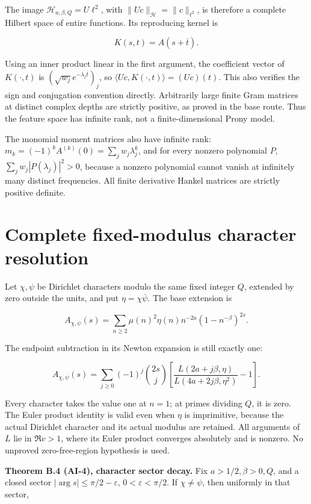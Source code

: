 The image \(\mathcal H_{a,\beta,Q}=U\ell^2\), with
\(\|Uc\|_{\mathcal H}=\|c\|_{\ell^2}\), is therefore a complete Hilbert
space of entire functions. Its reproducing kernel is

\[
 K(s,t)=A(s+\overline t).
\]

Using an inner product linear in the first argument, the coefficient
vector of \(K(\cdot,t)\) is \((\sqrt{w_j}e^{-\lambda_j\overline t})_j\),
so \(\langle Uc,K(\cdot,t)\rangle=(Uc)(t)\). This also verifies the sign
and conjugation convention directly. Arbitrarily large finite Gram
matrices at distinct complex depths are strictly positive, as proved in
the base route. Thus the feature space has infinite rank, not a
finite-dimensional Prony model.

The monomial moment matrices also have infinite rank:
\(m_k=(-1)^kA^{(k)}(0)=\sum_jw_j\lambda_j^k\), and for every nonzero
polynomial \(P\), \(\sum_jw_j|P(\lambda_j)|^2>0\), because a nonzero
polynomial cannot vanish at infinitely many distinct frequencies. All
finite derivative Hankel matrices are strictly positive definite.

\hypertarget{complete-fixed-modulus-character-resolution}{%
\section{Complete fixed-modulus character
resolution}\label{complete-fixed-modulus-character-resolution}}

Let \(\chi,\psi\) be Dirichlet characters modulo the same fixed integer
\(Q\), extended by zero outside the units, and put
\(\eta=\chi\overline\psi\). The base extension is

\[
 A_{\chi,\psi}(s)=\sum_{n\ge2}\mu(n)^2
            \eta(n)n^{-2a}(1-n^{-\beta})^{2s}.
\]

The endpoint subtraction in its Newton expansion is still exactly one:

\[
 A_{\chi,\psi}(s)
 =\sum_{j\ge0}(-1)^j\binom{2s}{j}
 \left[\frac{L(2a+j\beta,\eta)}
              {L(4a+2j\beta,\eta^2)}-1\right].
\]

Every character takes the value one at \(n=1\); at primes dividing
\(Q\), it is zero. The Euler product identity is valid even when
\(\eta\) is imprimitive, because the actual Dirichlet character and its
actual modulus are retained. All arguments of \(L\) lie in \(\Re v>1\),
where its Euler product converges absolutely and is nonzero. No unproved
zero-free-region hypothesis is used.

\textbf{Theorem B.4 (AI-4), character sector decay.} Fix \(a>1/2,\beta>0,Q\),
and a closed sector \(|\arg s|\le\pi/2-\varepsilon\),
\(0<\varepsilon<\pi/2\). If \(\chi\ne\psi\), then uniformly in that
sector,

